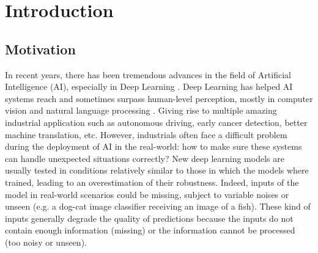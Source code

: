 
\chapter{Introduction} 
\label{chapter-introduction} 


\section{Motivation}

In recent years, there has been tremendous advances in the field of Artificial Intelligence (AI), especially in Deep Learning \citep{lecun-dl, deeplearning-overview}. Deep Learning has helped AI systems reach and sometimes surpass human-level perception, mostly in computer vision \citep{image-recognition} and natural language processing \citep{machine-translation}. Giving rise to multiple amazing industrial application such as autonomous driving, early cancer detection, better machine translation, etc. However, industrials often face a difficult problem during the deployment of AI in the real-world: how to make sure these systems can handle unexpected situations correctly? New deep learning models are usually tested in conditions relatively similar to those in which the models where trained, leading to an overestimation of their robustness. Indeed, inputs of the model in real-world scenarios could be missing, subject to variable noises or unseen (e.g. a dog-cat image classifier receiving an image of a fish). These kind of inputs generally degrade the quality of predictions because the inputs do not contain enough information (missing) or the information cannot be processed (too noisy or unseen).

